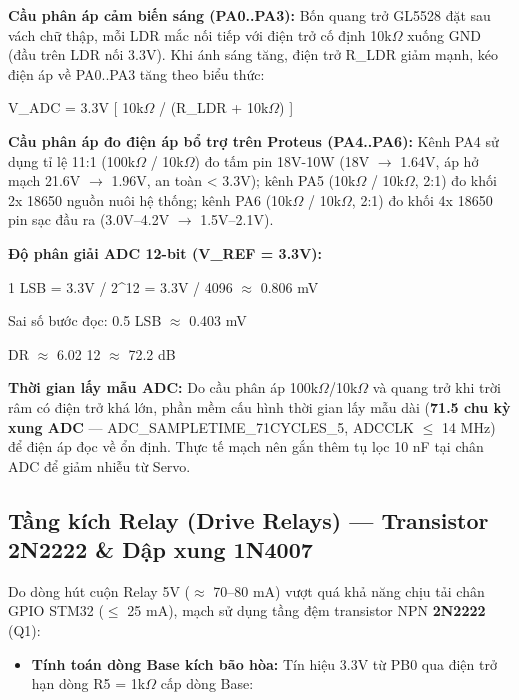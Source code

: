 \documentclass[12pt,a4paper]{report}
\begin{document}
\textbf{Cầu phân áp cảm biến sáng (PA0..PA3):} Bốn quang trở GL5528 đặt sau vách chữ thập, mỗi LDR mắc nối tiếp với điện trở cố định 10k\ensuremath{\Omega} xuống GND (đầu trên LDR nối 3.3V). Khi ánh sáng tăng, điện trở R\_LDR giảm mạnh, kéo điện áp về PA0..PA3 tăng theo biểu thức:

V\_ADC = 3.3V \texttimes{} [ 10k\ensuremath{\Omega} / (R\_LDR + 10k\ensuremath{\Omega}) ]

\textbf{Cầu phân áp đo điện áp bổ trợ trên Proteus (PA4..PA6):} Kênh PA4 sử dụng tỉ lệ 11:1 (100k\ensuremath{\Omega} / 10k\ensuremath{\Omega}) đo tấm pin 18V-10W (18V \ensuremath{\to} 1.64V, áp hở mạch 21.6V \ensuremath{\to} 1.96V, an toàn < 3.3V); kênh PA5 (10k\ensuremath{\Omega} / 10k\ensuremath{\Omega}, 2:1) đo khối 2x 18650 nguồn nuôi hệ thống; kênh PA6 (10k\ensuremath{\Omega} / 10k\ensuremath{\Omega}, 2:1) đo khối 4x 18650 pin sạc đầu ra (3.0V--4.2V \ensuremath{\to} 1.5V--2.1V).

\textbf{Độ phân giải ADC 12-bit (V\_REF = 3.3V):}

1 LSB = 3.3V / 2\textasciicircum{}12 = 3.3V / 4096 \ensuremath{\approx} 0.806 mV   

Sai số bước đọc: \textpm{}0.5 LSB \ensuremath{\approx} \textpm{}0.403 mV   

DR \ensuremath{\approx} 6.02 \texttimes{} 12 \ensuremath{\approx} 72.2 dB

\textbf{Thời gian lấy mẫu ADC:} Do cầu phân áp 100k\ensuremath{\Omega}/10k\ensuremath{\Omega} và quang trở khi trời râm có điện trở khá lớn, phần mềm cấu hình thời gian lấy mẫu dài (\textbf{71.5 chu kỳ xung ADC} --- ADC\_SAMPLETIME\_71CYCLES\_5, ADCCLK \ensuremath{\le} 14 MHz) để điện áp đọc về ổn định. Thực tế mạch nên gắn thêm tụ lọc 10 nF tại chân ADC để giảm nhiễu từ Servo.

\subsection{Tầng kích Relay (Drive Relays) --- Transistor 2N2222 \& Dập xung 1N4007}

Do dòng hút cuộn Relay 5V (\ensuremath{\approx} 70--80 mA) vượt quá khả năng chịu tải chân GPIO STM32 (\ensuremath{\le} 25 mA), mạch sử dụng tầng đệm transistor NPN \textbf{2N2222} (Q1):
\begin{itemize}[leftmargin=1.5em,itemsep=3pt]
  \item \textbf{Tính toán dòng Base kích bão hòa:} Tín hiệu 3.3V từ PB0 qua điện trở hạn dòng R5 = 1k\ensuremath{\Omega} cấp dòng Base:
\end{itemize}
\end{document}
